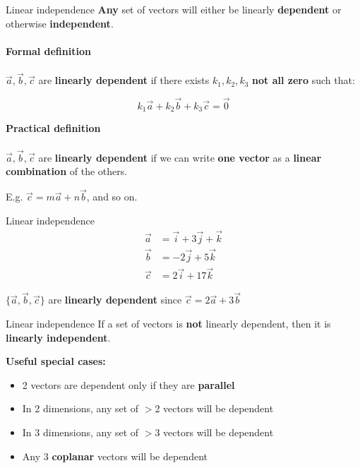 \documentclass{beamer}
\begin{document}
\begin{frame}{Linear independence}
	\textbf{Any} set of vectors will either be linearly \textbf{dependent} or otherwise \textbf{independent}.\\~\\
	
	\textbf{Formal definition}\\~\\
	
	$\vec{a}, \vec{b}, \vec{c}$ are \textbf{linearly dependent} if there exists $k_1, k_2, k_3$ \textbf{not all zero} such that:
	
	$$k_1\vec{a} + k_2\vec{b} + k_3\vec{c} = \vec{0}$$
	
	\textbf{Practical definition}\\~\\
	
	$\vec{a}, \vec{b}, \vec{c}$ are \textbf{linearly dependent} if we can write \textbf{one vector} as a \textbf{linear combination} of the others.
	
	E.g. $\vec{c} = m\vec{a} + n\vec{b}$, and so on.
\end{frame}

\begin{frame}{Linear independence}
	\begin{align*}
		\vec{a} &= \vec{i} + 3\vec{j} + \vec{k}\\
		\vec{b} &= -2\vec{j} + 5\vec{k}\\
		\vec{c} &= 2\vec{i} + 17\vec{k}
	\end{align*}
	
	$\{\vec{a}, \vec{b}, \vec{c}\}$ are \textbf{linearly dependent} since
	$\vec{c} = 2\vec{a} + 3\vec{b}$
\end{frame}

\begin{frame}{Linear independence}
	If a set of vectors is \textbf{not} linearly dependent, then it is \textbf{linearly independent}.
	
	\textbf{Useful special cases:}
	\begin{itemize}
		\item 2 vectors are dependent only if they are \textbf{parallel}
		\item In 2 dimensions, any set of $>$2 vectors will be dependent
		\item In 3 dimensions, any set of $>$3 vectors will be dependent
		\item Any 3 \textbf{coplanar} vectors will be dependent
	\end{itemize}
\end{frame}
\end{document}
